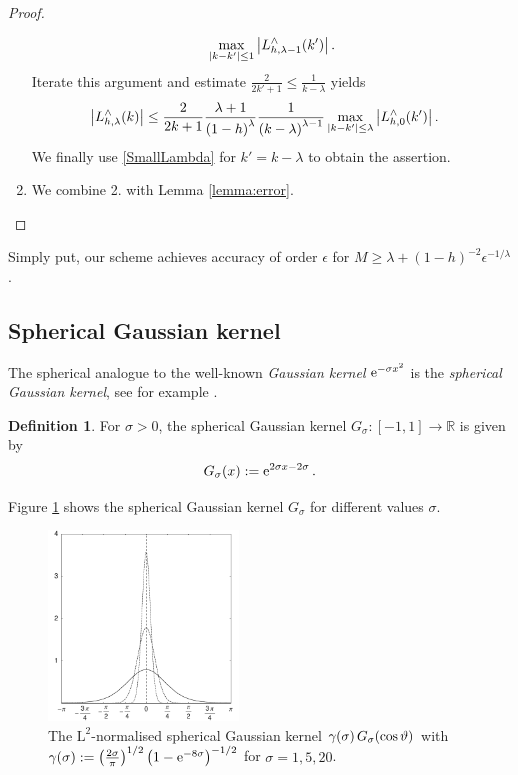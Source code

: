 \documentclass[11pt,a4paper,twoside,bibtotoc]{scrartcl}
\theoremstyle{plain}
\theoremstyle{definition}
\newtheorem{definition}[theorem]{Definition}
\theoremstyle{remark}
\newcommand{\R}{\ensuremath{\mathbb{R}}}
\newcommand{\fun}[2]{\ensuremath{#1{\hspace{-0.4ex}}\left(#2\right)}}
\newcommand{\e}{\mbox{\rm{e}}}
\numberwithin{equation}{section}
\numberwithin{table}{section}
\numberwithin{figure}{section}
\begin{document}
\begin{proof}
\begin{enumerate}
\begin{equation*}
      \max\limits_{|k-k'|\le 1}
      \left|\fun{L_{h,\lambda-1}^{\wedge}}{k'}\right|.
    \end{equation*}
    Iterate this argument and estimate $\frac{2}{2k'+1}\le
    \frac{1}{k-\lambda}$ yields
    \begin{align*}
      \left|\fun{L_{h,\lambda}^{\wedge}}{k}\right|
      & \le \frac{2}{2k+1} \frac{\lambda+1}{\left(1-h\right)^{\lambda}}
        \frac{1}{\left(k-\lambda\right)^{\lambda-1}} 
        \max_{|k-k'| \le \lambda} 
        \left|\fun{L_{h,0}^{\wedge}}{k'}\right|.
    \end{align*}
    We finally use \eqref{SmallLambda} for $k'=k-\lambda$ to obtain the
    assertion.
  \item We combine 2. with Lemma \ref{lemma:error}. 
  \end{enumerate}
\end{proof}

Simply put, our scheme achieves accuracy of order $\epsilon$ for $M \ge
\lambda + (1-h)^{-2} {\epsilon}^{-1/\lambda}$.

\subsection{Spherical Gaussian kernel}
The spherical analogue to the well-known \emph{Gaussian kernel} $\e^{-\sigma x^2}$ is the 
\emph{spherical Gaussian kernel}, see for example \cite{bahu01}.
\begin{definition}
  For $\sigma>0$, the spherical Gaussian kernel
  $G_{\sigma}:[-1,1] \rightarrow \R$ is given by
  \begin{equation}
    \label{GaussKernel}
    \nonumber
    \fun{G_{\sigma}}{x} := \e^{2\sigma x-2\sigma}\,.
  \end{equation}
\end{definition}

Figure \ref{Basics:Figure:GKernel} shows the spherical Gaussian kernel $G_{\sigma}$ for
different values $\sigma$.
\begin{figure}[tb]
  \centering
  \includegraphics[width=0.45\textwidth]{images/gaussian}
  \caption{The $\text{L}^2$-normalised spherical Gaussian kernel 
  $\fun{\gamma}{\sigma} \fun{G_{\sigma}}{\cos\vartheta}$ with
  $\fun{\gamma}{\sigma} := \left(\frac{2\sigma}{\pi}\right)^{1/2} \left(1-\e^{-8\sigma}\right)^{-1/2}$ for $\sigma = 1,5,20$.}
  \label{Basics:Figure:GKernel}
\end{figure}
\end{document}
